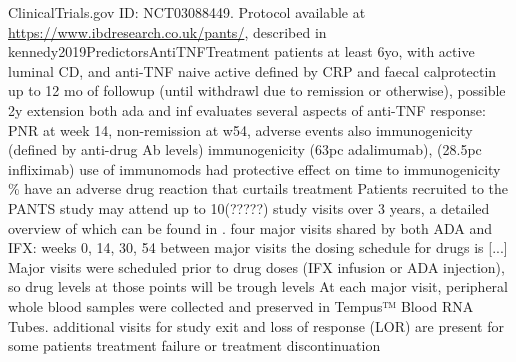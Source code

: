 \begin{outline}
\1 ClinicalTrials.gov ID: NCT03088449.
\2 Protocol available at \url{https://www.ibdresearch.co.uk/pants/}, described in kennedy2019PredictorsAntiTNFTreatment
    \2 patients at least 6yo, with active luminal CD, and anti-TNF naive
        \3 active defined by CRP and faecal calprotectin
    \2 up to 12 mo of followup (until withdrawl due to remission or otherwise), possible 2y extension
    \2 both ada and inf
    \2 evaluates several aspects of anti-TNF response: PNR at week 14, non-remission at w54, adverse events
        \3 also immunogenicity (defined by anti-drug Ab levels)
    \2 immunogenicity (63pc adalimumab), (28.5pc infliximab)
        \3 use of immunomods had protective effect on time to immunogenicity 
    \% have an adverse drug reaction that curtails treatment
\1 Patients recruited to the \gls{PANTS} study may attend up to 10(?????) study visits over 3 years, a detailed overview of which can be found in \textcite{kennedy2019PredictorsAntiTNFTreatment}. 
    \2 four major visits shared by both ADA and IFX: weeks 0, 14, 30, 54
    \2 between major visits the dosing schedule for drugs is [...]
    \2 Major visits were scheduled prior to drug doses (IFX infusion or ADA injection), so drug levels at those points will be trough levels
    \2 At each major visit, peripheral whole blood samples were collected and preserved in Tempus™ Blood RNA Tubes.
    \2 additional visits for study exit and loss of response (LOR) are present for some patients
        \3 treatment failure or treatment discontinuation


\end{outline}
